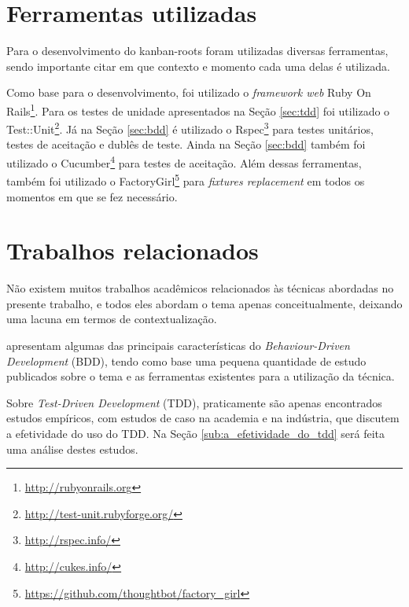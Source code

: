 \section{Ferramentas utilizadas}

Para o desenvolvimento do kanban-roots foram utilizadas diversas ferramentas, sendo importante citar em que contexto e momento cada uma delas é utilizada.

Como base para o desenvolvimento, foi utilizado o \textit{framework web} Ruby On Rails\footnote{\url{http://rubyonrails.org}}. Para os testes de unidade apresentados na Seção \ref{sec:tdd} foi utilizado o Test::Unit\footnote{\url{http://test-unit.rubyforge.org/}}. Já na Seção \ref{sec:bdd} é utilizado o Rspec\footnote{\url{http://rspec.info/}} para testes unitários, testes de aceitação e dublês de teste. Ainda na Seção \ref{sec:bdd} também foi utilizado o Cucumber\footnote{\url{http://cukes.info/}} para testes de aceitação. Além dessas ferramentas, também foi utilizado o FactoryGirl\footnote{\url{https://github.com/thoughtbot/factory_girl}} para \textit{fixtures replacement} em todos os momentos em que se fez necessário.

\section{Trabalhos relacionados} %
\label{sec:trabalhos_relacionados}

Não existem muitos trabalhos acadêmicos relacionados às técnicas abordadas no presente trabalho, e todos eles abordam o tema apenas conceitualmente, deixando uma lacuna em termos de contextualização.

 apresentam algumas das principais características do \textit{Behaviour-Driven Development} (BDD), tendo como base uma pequena quantidade de estudo publicados sobre o tema e as ferramentas existentes para a utilização da técnica.

Sobre \textit{Test-Driven Development} (TDD), praticamente são apenas encontrados estudos empíricos, com estudos de caso na academia e na indústria, que discutem a efetividade do uso do TDD. Na Seção \ref{sub:a_efetividade_do_tdd} será feita uma análise destes estudos.

